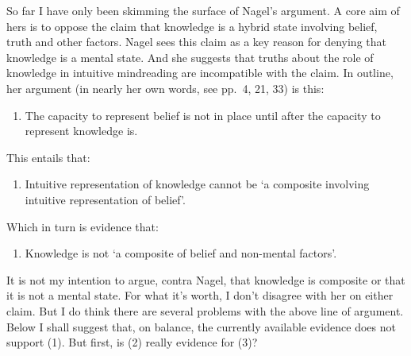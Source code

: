 \documentclass[11pt,a4paper]{extarticle}
\begin{document}
So far I have only been skimming the surface of Nagel's argument.
A core aim of hers is to oppose the claim that knowledge is a hybrid state involving belief, truth and other factors.
Nagel sees this claim as a key reason for denying that knowledge is a mental state.
And she suggests that truths about the role of knowledge in intuitive mindreading are incompatible with the claim.
In outline, her argument (in nearly her own words, see pp.\ 4, 21, 33) is this:
%
\begin{enumerate}
\item The capacity to represent belief is not in place until after the capacity to represent knowledge is.
\end{enumerate}
This entails that:
\begin{enumerate}[resume]
\item Intuitive representation of knowledge cannot be `a composite involving intuitive representation of belief'.
\end{enumerate}
Which in turn is evidence that:
\begin{enumerate}[resume]
\item Knowledge is not `a composite of belief and non-mental factors'.
\end{enumerate}
%
It is not my intention to argue, contra Nagel, that knowledge is composite or that it is not a mental state.
For what it's worth,
I don't disagree with her on either claim.
But I do think there are several problems with the above line of argument.
Below I shall suggest that, on balance, the currently available evidence does not support (1).  
But first, is (2) really evidence for (3)?
\end{document}
